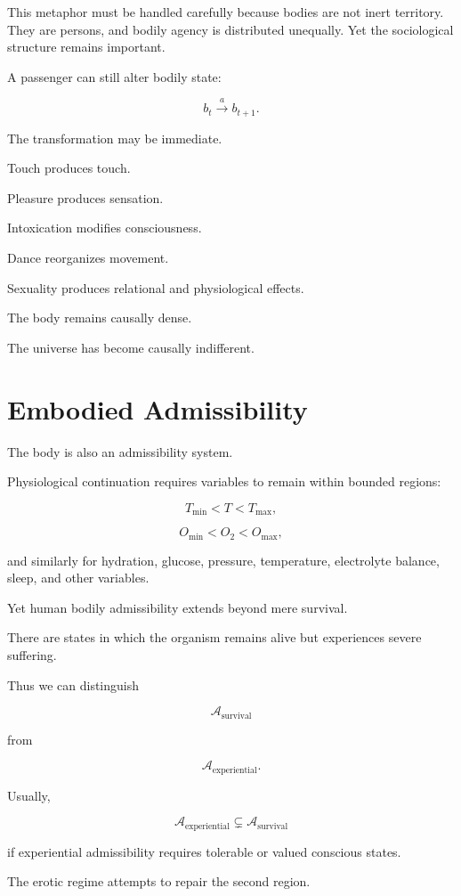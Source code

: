 \documentclass[11pt,oneside]{book}
\theoremstyle{definition}
\theoremstyle{remark}
\newcommand{\A}{\mathcal{A}}
\begin{document}
This metaphor must be handled carefully because bodies are not inert territory. They are persons, and bodily agency is distributed unequally. Yet the sociological structure remains important.

A passenger can still alter bodily state:

\[
b_t
\xrightarrow{a}
b_{t+1}.
\]

The transformation may be immediate.

Touch produces touch.

Pleasure produces sensation.

Intoxication modifies consciousness.

Dance reorganizes movement.

Sexuality produces relational and physiological effects.

The body remains causally dense.

The universe has become causally indifferent.

\section{Embodied Admissibility}

The body is also an admissibility system.

Physiological continuation requires variables to remain within bounded regions:

\[
T_{\min}
<
T
<
T_{\max},
\]

\[
O_{\min}
<
O_2
<
O_{\max},
\]

and similarly for hydration, glucose, pressure, temperature, electrolyte balance, sleep, and other variables.

Yet human bodily admissibility extends beyond mere survival.

There are states in which the organism remains alive but experiences severe suffering.

Thus we can distinguish

\[
\A_{\mathrm{survival}}
\]

from

\[
\A_{\mathrm{experiential}}.
\]

Usually,

\[
\A_{\mathrm{experiential}}
\subsetneq
\A_{\mathrm{survival}}
\]

if experiential admissibility requires tolerable or valued conscious states.

The erotic regime attempts to repair the second region.
\end{document}
